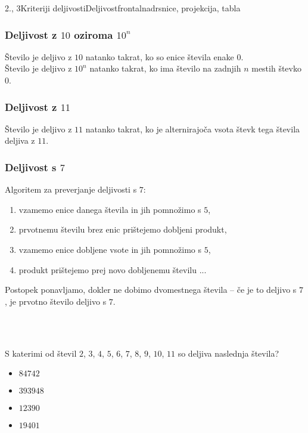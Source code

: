 \begin{priprava}{2., 3}{}{Kriteriji deljivosti}{Deljivost}{frontalna}{drsnice, projekcija, tabla}
    \subsubsection*{Deljivost z $10$ oziroma $10^n$}
        Število je deljivo z $10$ natanko takrat, ko so enice števila enake $0$.
        \\Število je deljivo z $10^n$ natanko takrat, ko ima število na zadnjih $n$ mestih števko $0$.

    \subsubsection*{Deljivost z $11$}
        Število je deljivo z $11$ natanko takrat, ko je alternirajoča vsota števk tega števila deljiva z $11$.

    \subsubsection*{Deljivost s $7$}
        Algoritem za preverjanje deljivosti s $7$:
        \begin{enumerate}
            \item vzamemo enice danega števila in jih pomnožimo s $5$,
            \item prvotnemu številu brez enic prištejemo dobljeni produkt,
            \item vzamemo enice dobljene vsote in jih pomnožimo s $5$,
            \item produkt prištejemo prej novo dobljenemu številu ...     
        \end{enumerate}
        Postopek ponavljamo, dokler ne dobimo dvomestnega števila -- 
        če je to deljivo s $7$, je prvotno število deljivo s $7$. 
        

~\\~

    \begin{naloga}
        S katerimi od števil $2$, $3$, $4$, $5$, $6$, $7$, $8$, $9$, $10$, $11$ so deljiva naslednja števila?
        \begin{itemize}
            \item $84742$ 
            \item $393948$ 
            \item $12390$ 
            \item $19401$ 
        \end{itemize}
    \end{naloga}




\end{priprava}
